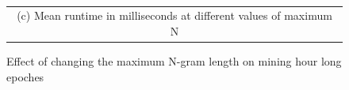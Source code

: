 \documentclass[letterpaper,12pt,titlepage,oneside,final]{book}
\begin{document}
\begin{figure}
{}
\\
\begin{tabular}{c}
\\(c) Mean runtime in milliseconds at different values of maximum N
\end{tabular}
\caption{Effect of changing the maximum N-gram length on mining hour long epoches}
\label{fig:ngramsLen}
\end{figure} 
\end{document}

